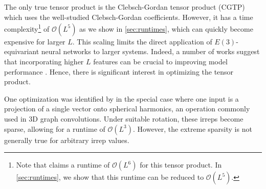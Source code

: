 \documentclass{article}
\renewcommand{\O}{\mathcal{O}}
\theoremstyle{definition}
\theoremstyle{remark}
\begin{document}
The only true tensor product is the Clebsch-Gordan tensor product (CGTP) which uses the well-studied Clebsch-Gordan \citep{varshalovich1988quantum} coefficients. However, it has a time complexity\footnote{Note that \citet{escn} claims a runtime of $\O(L^6)$ for this tensor product. In \autoref{sec:runtimes}, we show that this runtime can be reduced to $\O(L^5)$.} of $\O(L^5)$ as we show in \autoref{sec:runtimes}, which can quickly become expensive for larger $L$. This scaling limits the direct application of $E(3)$-equivariant neural networks to larger systems. Indeed, a number of works suggest that incorporating higher $L$ features can be crucial to improving model performance \citep{cenhigh,frank2022so3krates,aykentgotennet}. Hence, there is significant interest in optimizing the tensor product.

One optimization was identified by \citet{escn} in the special case where one input is a projection of a single vector onto spherical harmonics, an operation commonly used in 3D graph convolutions. Under suitable rotation, these irreps become sparse, allowing for a runtime of $\O(L^3)$. However, the extreme sparsity is not generally true for arbitrary irrep values.




\end{document}
